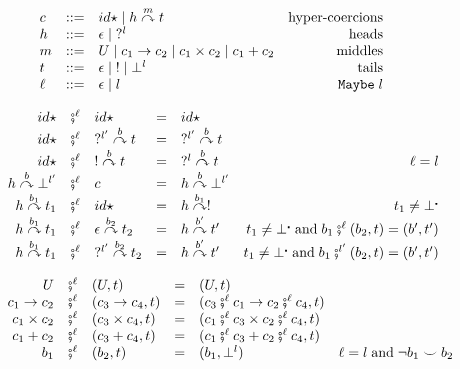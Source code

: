 \documentclass[acmsmall,review,anonymous]{acmart}\settopmatter{printfolios=true,printccs=false,printacmref=false}
\newcommand{\stxrule}[3]{#1 & ::= & #3 & \text{#2}\\}
\newcommand{\comprule}[4]{#1 & \fatsemi^\ell & #2 & = & #3 & #4 \\}
\newcommand{\plus}[0]{+}
\newcommand{\hyperCoercionI}[0]{id\star}
\newcommand{\hyperCoercionC}[3]{#1 \overset{#2}{\curvearrowright} #3}
\begin{document}
\begin{figure}
	\[ 
	\begin{array}{lclr}
	\stxrule{c}{hyper-coercions}{
		\hyperCoercionI \mid{}
		\hyperCoercionC{h}{m}{t}
	}
	\stxrule{h}{heads}{
		\epsilon \mid{}
		?^l
	}
	\stxrule{m}{middles}{
		U \mid{}
		c_1 \rightarrow c_2 \mid{}
		c_1 \times c_2 \mid{}
		c_1 \plus c_2
	}
	\stxrule{t}{tails}{
		\epsilon \mid{}
		! \mid{}
		\bot^l
	}
	\stxrule{\ell}{$ \mathtt{Maybe} \; l $}{
		\epsilon \mid{}
		l
	}
	\end{array}
	\]
	
	\[ 
	\begin{array}{rclclr}

	\comprule{
		\hyperCoercionI
	}{
		\hyperCoercionI
	}{
		\hyperCoercionI
	}{}

	\comprule{
		\hyperCoercionI
	}{
		\hyperCoercionC{?^{l'}}{b}{t}
	}{
		\hyperCoercionC{?^{l'}}{b}{t}
	}{}

	\comprule{
		\hyperCoercionI
	}{
		\hyperCoercionC{!}{b}{t}
	}{
		\hyperCoercionC{?^{l}}{b}{t}
	}{\ell = l}

	\comprule{
		\hyperCoercionC{h}{b}{\bot^{l'}}
	}{
		c
	}{
		\hyperCoercionC{h}{b}{\bot^{l'}}
	}{}

	\comprule{
		\hyperCoercionC{h}{b_1}{t_1}
	}{
		\hyperCoercionI
	}{
		\hyperCoercionC{h}{b_1}{!}
	}{
		t_1 \neq \bot^{\centerdot}
	}

	\comprule{
		\hyperCoercionC{h}{b_1}{t_1}
	}{
		\hyperCoercionC{\epsilon}{b_2}{t_2}
	}{
		\hyperCoercionC{h}{b'}{t'}
	}{
		t_1 \neq \bot^{\centerdot} \; \text{and} \;
		b_1 \fatsemi^{\ell} (b_2, t) = (b', t')
	}

	\comprule{
		\hyperCoercionC{h}{b_1}{t_1}
	}{
		\hyperCoercionC{?^{l'}}{b_2}{t_2}
	}{
		\hyperCoercionC{h}{b'}{t'}
	}{
		t_1 \neq \bot^{\centerdot} \; \text{and} \;
		b_1 \fatsemi^{l'} (b_2, t) = (b', t')
	}
	\end{array}
	\]
	
	\[ 
	\begin{array}{rclclr}
	\comprule{U}{(U,t)}{
		(U,t)
	}{}
	\comprule{c_1 \rightarrow c_2}{(c_3 \rightarrow c_4,t)}{
		(c_3 \fatsemi^{\ell} c_1 \rightarrow c_2 \fatsemi^\ell c_4, t)
	}{}
	\comprule{c_1 \times c_2}{(c_3 \times c_4,t)}{
		(c_1 \fatsemi^{\ell} c_3 \times c_2 \fatsemi^\ell c_4, t)
	}{}
	\comprule{c_1 \plus c_2}{(c_3 \plus c_4,t)}{
		(c_1 \fatsemi^{\ell} c_3 \plus c_2 \fatsemi^\ell c_4, t)
	}{}
	\comprule{b_1}{(b_2,t)}{
		(b_1,\bot^l)
	}{
		\ell = l \; \text{and} \;
		\neg b_1 \smile b_2 
	}
	\end{array}
	\]
	

\end{figure}
\end{document}
